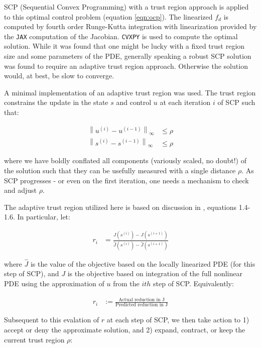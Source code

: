 \documentclass[11pt]{article}
\newcommand{\normnew}[2]{\left \lVert #1 \right \rVert_{#2}}
\begin{document}
SCP (Sequential Convex Programming) with a trust region approach is applied to this optimal control problem (equation \ref{eqn:ocp}). The linearized $f_d$ is computed by fourth order Runge-Kutta integration with linearization provided by the \texttt{JAX} computation of the Jacobian. \texttt{CVXPY} is used to compute the optimal solution. While it was found that one might be lucky with a fixed trust region size and some parameters of the PDE, generally speaking a robust SCP solution was found to require an adaptive trust region approach. Otherwise the solution would, at best, be slow to converge.

A minimal implementation of an adaptive trust region was used. The trust region constrains the update in the state $s$ and control $u$ at each iteration $i$ of SCP such that:

\begin{align}
\normnew{u^{(i)} - u^{(i-1)}}{\infty} &\leq \rho \nonumber \\
\normnew{s^{(i)} - s^{(i-1)}}{\infty} &\leq \rho \nonumber 
\end{align}

where we have boldly conflated all components (variously scaled, no doubt!) of the solution such that they can be usefully measured with a single distance $\rho$. As SCP progresses - or even on the first iteration, one needs a mechanism to check and adjust $\rho$.

The adaptive trust region utilized here is based on discussion in \cite{R6}, equations 1.4-1.6. In particular, let:

\begin{align}
r_{i} &= \frac{J(s^{(i)}) - J(s^{(i+1)})}{\hat{J}(s^{(i)}) - \hat{J}(s^{(i+1)})}
\end{align}

where $\hat{J}$ is the value of the objective based on the locally linearized PDE (for this step of SCP), and $J$ is the objective based on integration of the full nonlinear PDE using the approximation of $u$ from the $ith$ step of SCP. Equivalently:

\begin{align}
r_i &:= \frac{\text{Actual reduction in J}}{\text{Predicted reduction in J}}
\end{align}

Subsequent to this evalation of $r$ at each step of SCP, we then take action to 1) accept or deny the approximate solution, and 2) expand, contract, or keep the current trust region $\rho$:
\end{document}

